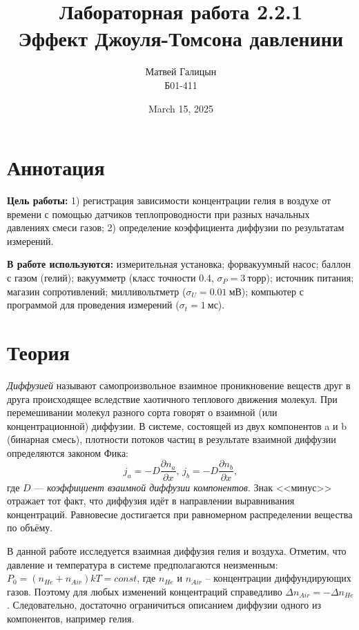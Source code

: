 \documentclass[a4paper, 10pt, twocolumn]{article}
\title{Лабораторная работа 2.2.1 \\ Эффект Джоуля-Томсона
давленини}
\author{Матвей Галицын \\ Б01-411}
\date{March 15, 2025}
\begin{document}
\maketitle
\newpage{}
\section{Аннотация}

    \textbf{Цель работы:} 1) регистрация зависимости концентрации гелия в воздухе от времени с помощью датчиков теплопроводности при разных начальных давлениях смеси газов; 2) определение коэффициента диффузии по результатам измерений.

    \textbf{В работе используются:} измерительная установка; форвакуумный насос; баллон с газом  (гелий); вакуумметр (класс точности 0.4, $\sigma_P = 3~торр$); источник питания; магазин сопротивлений; милливольтметр ($\sigma_U = 0.01~мВ$); компьютер с программой для проведения измерений ($\sigma_t = 1~мс$).

\section{Теория}
    \textit{Диффузией}  называют самопроизвольное взаимное проникновение веществ друг в друга происходящее вследствие хаотичного теплового движения молекул. При перемешивании молекул разного сорта говорят о взаимной (или концентрационной) диффузии. В системе, состоящей из двух компонентов a и b (бинарная смесь), плотности потоков частиц в результате взаимной диффузии определяются законом Фика:
    \begin{equation}
        j_a = -D \frac{\partial n_a}{\partial x}, \, j_b = -D \frac{\partial n_b}{\partial x},
    \end{equation}
    где $D$ — \textit{коэффициент взаимной диффузии компонентов}. Знак <<минус>> отражает тот факт, что диффузия идёт в направлении выравнивания концентраций. Равновесие достигается при равномерном распределении вещества по объёму.

    В данной работе исследуется взаимная диффузия гелия и воздуха. Отметим, что давление и температура в системе предполагаются неизменным: $P_0 = (n_{He}+n_{Air})kT = const$, где $n_{He}$  и $n_{Air}$ -- концентрации диффундирующих газов. Поэтому для любых изменений концентраций справедливо $\Delta n_{Air} = -\Delta n_{He}$. Следовательно, достаточно ограничиться описанием диффузии одного из компонентов, например гелия.
\end{document}
